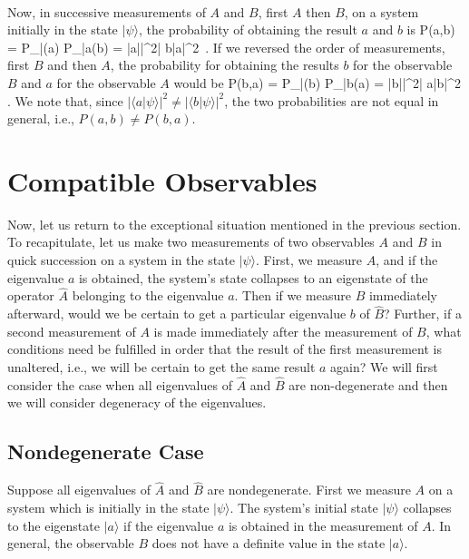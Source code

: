 \paragraph{}
Now, in successive measurements of $A$ and $B$, first $A$ then $B$, on a system initially in the state $|\psi\rangle$, the probability of obtaining the result $a$ and $b$ is
\be
P(a,b) = P_{|\psi\rangle}(a) P_{|a\rangle}(b) = \left|\langle a|\psi\rangle\right|^2\left| \langle b|a\rangle\right|^2\, .
\ee
If we reversed the order of measurements, first $B$ and then $A$,  the probability for obtaining the results
$b$ for the observable $B$ and $a$ for the observable $A$ would be
\be
P(b,a) = P_{|\psi\rangle}(b) P_{|b\rangle}(a) = \left|\langle b|\psi\rangle\right|^2\left| \langle a|b\rangle\right|^2\, .
\ee
We note that, since $\left|\langle a|\psi\rangle\right|^2\neq \left|\langle b|\psi\rangle\right|^2$, the two probabilities are not equal in general, 
i.e., $P(a,b)\neq P(b,a)$.



\section{Compatible Observables}
Now, let us return to the exceptional situation mentioned in the previous section. To recapitulate, let us make two 
measurements of two observables $A$ and $B$ in quick succession on a system in the state $|\psi\rangle$. First, we measure $A$, and if the eigenvalue $a$ is obtained, the system's state collapses to an eigenstate of the operator $\hat{A}$ belonging to the eigenvalue $a$. Then if we measure $B$ immediately afterward, would we be certain to get a particular eigenvalue $b$ of $\hat{B}$? Further, if a second measurement of $A$ is made immediately after the measurement of $B$, what conditions need be fulfilled in order that the result of the first measurement is unaltered, i.e., we will be certain to get the same result $a$ again? We will first consider the case when all eigenvalues of $\hat{A}$  and 
$\hat{B}$ are non-degenerate and then we will consider degeneracy of the eigenvalues. 

\subsection {Nondegenerate Case}
Suppose all eigenvalues of $\hat{A}$ and $\hat{B}$ are nondegenerate. First we measure $A$ on a system which 
is initially in the state $|\psi\rangle$. The system's initial state $|\psi\rangle$ collapses to the eigenstate 
$|a\rangle$ if the eigenvalue $a$ is obtained in the measurement of $A$. In general, the observable $B$ does not have a definite value in the state $|a\rangle$.

